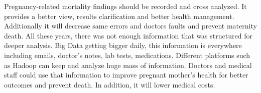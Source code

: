 \documentclass[sigconf]{acmart}
\begin{document}
Pregnancy-related mortality findings should be recorded and cross analyzed. It provides a better view, results clarification and better health management. Additionally it will decrease same errors and doctors faults and prevent maternity death. All these years, there was not enough information that was structured for deeper analysis. Big Data getting bigger daily, this information is everywhere including emails, doctor’s notes, lab tests, medications. Different platforms such as Hadoop can keep and analyze huge mass of information. Doctors and medical staff could use that information to improve pregnant mother’s health for better outcomes and prevent death. In addition, it will lower medical costs.






 
\end{document}
